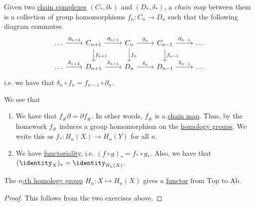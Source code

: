 \begin{definition}\label{def:chain-map}
	Given two \hyperref[def:chain-complex]{chain complexes} $(C_\ast, \partial_\ast)$ and $(D_\ast, \delta_\ast)$, a \emph{chain map} between them is a collection of
	group homomorphisms $f_n \colon C_n \to D_n$ such that the following diagram commutes.
	\[\begin{tikzcd}
			\ldots & {C_{n+1}} & {C_n} & {C_{n-1}} & \ldots \\
			\ldots & {D_{n+1}} & {D_n} & {D_{n-1}} & \ldots
			\arrow["{\partial_{n+2}}", from=1-1, to=1-2]
			\arrow["{\delta_{n+2}}", from=2-1, to=2-2]
			\arrow["{\delta_{n+1}}", from=2-2, to=2-3]
			\arrow["{\delta_{n}}", from=2-3, to=2-4]
			\arrow["{\partial_{n-1}}", from=1-4, to=1-5]
			\arrow["{\partial_{n}}", from=1-3, to=1-4]
			\arrow["{\partial_{n+1}}", from=1-2, to=1-3]
			\arrow["{\delta_{n-1}}", from=2-4, to=2-5]
			\arrow["{f_{n-1}}", from=1-4, to=2-4]
			\arrow["{f_{n}}", from=1-3, to=2-3]
			\arrow["{f_{n+1}}", from=1-2, to=2-2]
		\end{tikzcd}\]
	i.e. we have that $\delta_n \circ f_n = f_{n - 1} \circ \partial_n$.
\end{definition}

\begin{exercise}
	We see that
	\begin{enumerate}
		\item We have that $f_{\#} \partial = \partial f_{\#}$. In other words, $f_{\#}$ is a \hyperref[def:chain-map]{chain map}. Thus, by the homework $f_{\#}$ induces a group
		      homomorphism on the \hyperref[def:homology-group]{homology groups}. We write this as $f_\ast \colon H_n(X) \to H_n(Y)$ for all $n$.
		\item We have \underline{functoriality}, i.e. $(f \circ g)_\ast = f_\ast \circ g_\ast$. Also, we have that $(\identity_X)_\ast = \identity_{H_n(X)}$.
	\end{enumerate}
\end{exercise}

\begin{theorem}\label{thm:homology-group-defines-a-functor}
	The \hyperref[def:homology-group]{\(n\)-th homology group} $H_n \colon X \mapsto H_n(X)$ gives a \hyperref[def:functor]{functor} from $\underline{\mathrm{Top}}$
	to $\underline{\mathrm{Ab} }$.
\end{theorem}
\begin{proof}
	This follows from the two exercises above.
\end{proof}


